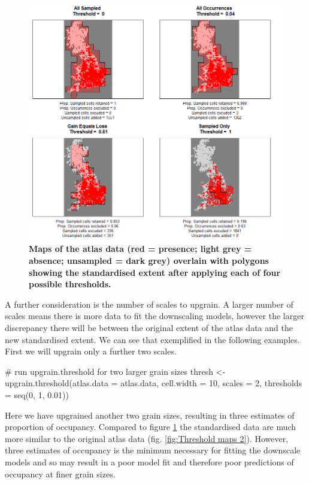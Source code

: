 \documentclass{article}[12pt, a4paper]
\begin{document}
\begin{figure}[!ht]
\centering
\includegraphics[width=\linewidth]{Threshold_maps.png}
\caption{\textbf{Maps of the atlas data (red = presence; light grey = absence; unsampled = dark grey) overlain with polygons showing the standardised extent after applying each of four possible thresholds.}}
\label{fig:Threshold maps}
\end{figure}

A further consideration is the number of scales to upgrain. A larger number of scales means there is more data to fit the downscaling models, however the larger discrepancy there will be between the original extent of the atlas data and the new standardised extent. We can see that exemplified in the following examples. First we will upgrain only a further two scales. 

\begin{Schunk}
\begin{Sinput}
# run upgrain.threshold for two larger grain sizes
thresh <- upgrain.threshold(atlas.data = atlas.data,
                            cell.width = 10,
                            scales = 2,
                            thresholds = seq(0, 1, 0.01))
\end{Sinput}
\end{Schunk}

Here we have upgrained another two grain sizes, resulting in three estimates of proportion of occupancy. Compared to figure \ref{fig:Threshold maps} the standardised data are much more similar to the original atlas data (fig. \ref{fig:Threshold maps 2}). However, three estimates of occupancy is the minimum necessary for fitting the downscale models and so may result in a poor model fit and therefore poor predictions of occupancy at finer grain sizes.
\end{document}

